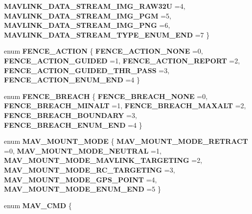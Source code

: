 \begin{DoxyCompactItemize}
\textbf{ M\+A\+V\+L\+I\+N\+K\+\_\+\+D\+A\+T\+A\+\_\+\+S\+T\+R\+E\+A\+M\+\_\+\+I\+M\+G\+\_\+\+R\+A\+W32U} =4, 
\newline
\textbf{ M\+A\+V\+L\+I\+N\+K\+\_\+\+D\+A\+T\+A\+\_\+\+S\+T\+R\+E\+A\+M\+\_\+\+I\+M\+G\+\_\+\+P\+GM} =5, 
\textbf{ M\+A\+V\+L\+I\+N\+K\+\_\+\+D\+A\+T\+A\+\_\+\+S\+T\+R\+E\+A\+M\+\_\+\+I\+M\+G\+\_\+\+P\+NG} =6, 
\textbf{ M\+A\+V\+L\+I\+N\+K\+\_\+\+D\+A\+T\+A\+\_\+\+S\+T\+R\+E\+A\+M\+\_\+\+T\+Y\+P\+E\+\_\+\+E\+N\+U\+M\+\_\+\+E\+ND} =7
 \}
\item 
enum \textbf{ F\+E\+N\+C\+E\+\_\+\+A\+C\+T\+I\+ON} \{ \newline
\textbf{ F\+E\+N\+C\+E\+\_\+\+A\+C\+T\+I\+O\+N\+\_\+\+N\+O\+NE} =0, 
\textbf{ F\+E\+N\+C\+E\+\_\+\+A\+C\+T\+I\+O\+N\+\_\+\+G\+U\+I\+D\+ED} =1, 
\textbf{ F\+E\+N\+C\+E\+\_\+\+A\+C\+T\+I\+O\+N\+\_\+\+R\+E\+P\+O\+RT} =2, 
\textbf{ F\+E\+N\+C\+E\+\_\+\+A\+C\+T\+I\+O\+N\+\_\+\+G\+U\+I\+D\+E\+D\+\_\+\+T\+H\+R\+\_\+\+P\+A\+SS} =3, 
\newline
\textbf{ F\+E\+N\+C\+E\+\_\+\+A\+C\+T\+I\+O\+N\+\_\+\+E\+N\+U\+M\+\_\+\+E\+ND} =4
 \}
\item 
enum \textbf{ F\+E\+N\+C\+E\+\_\+\+B\+R\+E\+A\+CH} \{ \newline
\textbf{ F\+E\+N\+C\+E\+\_\+\+B\+R\+E\+A\+C\+H\+\_\+\+N\+O\+NE} =0, 
\textbf{ F\+E\+N\+C\+E\+\_\+\+B\+R\+E\+A\+C\+H\+\_\+\+M\+I\+N\+A\+LT} =1, 
\textbf{ F\+E\+N\+C\+E\+\_\+\+B\+R\+E\+A\+C\+H\+\_\+\+M\+A\+X\+A\+LT} =2, 
\textbf{ F\+E\+N\+C\+E\+\_\+\+B\+R\+E\+A\+C\+H\+\_\+\+B\+O\+U\+N\+D\+A\+RY} =3, 
\newline
\textbf{ F\+E\+N\+C\+E\+\_\+\+B\+R\+E\+A\+C\+H\+\_\+\+E\+N\+U\+M\+\_\+\+E\+ND} =4
 \}
\item 
enum \textbf{ M\+A\+V\+\_\+\+M\+O\+U\+N\+T\+\_\+\+M\+O\+DE} \{ \newline
\textbf{ M\+A\+V\+\_\+\+M\+O\+U\+N\+T\+\_\+\+M\+O\+D\+E\+\_\+\+R\+E\+T\+R\+A\+CT} =0, 
\textbf{ M\+A\+V\+\_\+\+M\+O\+U\+N\+T\+\_\+\+M\+O\+D\+E\+\_\+\+N\+E\+U\+T\+R\+AL} =1, 
\textbf{ M\+A\+V\+\_\+\+M\+O\+U\+N\+T\+\_\+\+M\+O\+D\+E\+\_\+\+M\+A\+V\+L\+I\+N\+K\+\_\+\+T\+A\+R\+G\+E\+T\+I\+NG} =2, 
\textbf{ M\+A\+V\+\_\+\+M\+O\+U\+N\+T\+\_\+\+M\+O\+D\+E\+\_\+\+R\+C\+\_\+\+T\+A\+R\+G\+E\+T\+I\+NG} =3, 
\newline
\textbf{ M\+A\+V\+\_\+\+M\+O\+U\+N\+T\+\_\+\+M\+O\+D\+E\+\_\+\+G\+P\+S\+\_\+\+P\+O\+I\+NT} =4, 
\textbf{ M\+A\+V\+\_\+\+M\+O\+U\+N\+T\+\_\+\+M\+O\+D\+E\+\_\+\+E\+N\+U\+M\+\_\+\+E\+ND} =5
 \}
\item 
enum \textbf{ M\+A\+V\+\_\+\+C\+MD} \{ \newline

\end{DoxyCompactItemize}
